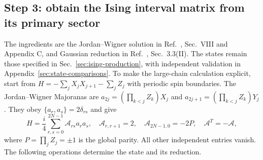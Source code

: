 \subsection{Step 3: obtain the Ising interval matrix from its primary sector}
\label{sec:large-ising}
The ingredients are the Jordan--Wigner solution in
Ref.~\cite{Montes2017}, Sec.~VIII and Appendix C, and Gaussian
reduction in Ref.~\cite{PeschelEisler}, Sec.~3.3(II).
The states remain those specified in Sec.~\ref{sec:ising-production},
with independent validation in Appendix~\ref{sec:state-comparisons}.
To make the large-chain calculation explicit,
start from $H=-\sum_jX_jX_{j+1}-\sum_jZ_j$ with periodic spin boundaries.
The Jordan--Wigner Majoranas are
$a_{2j}=(\prod_{k<j}Z_k)X_j$ and
$a_{2j+1}=(\prod_{k<j}Z_k)Y_j$. They obey
$\{a_r,a_s\}=2\delta_{rs}$ and give
\begin{equation}
 H=\frac i4\sum_{r,s=0}^{2N-1}\mathcal A_{rs}a_ra_s,
 \quad \mathcal A_{r,r+1}=2,\quad
 \mathcal A_{2N-1,0}=-2P,\quad \mathcal A^T=-\mathcal A,
\end{equation}
where $P=\prod_jZ_j=\pm1$ is the global parity. All other independent
entries vanish. The following operations determine the state and its reduction.
